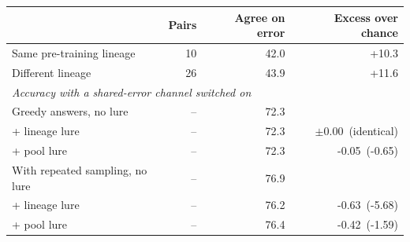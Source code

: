 \begin{tabular}{lrrr}
\toprule
& Pairs & Agree on error & Excess over chance \\
\midrule
Same pre-training lineage & 10 & 42.0 & +10.3 \\
Different lineage & 26 & 43.9 & +11.6 \\
\midrule
\multicolumn{4}{l}{\emph{Accuracy with a shared-error channel switched on}} \\
\quad Greedy answers, no lure & -- & 72.3 & \\
\quad\quad + lineage lure & -- & 72.3 & $\pm$0.00~(identical) \\
\quad\quad + pool lure & -- & 72.3 & -0.05~(-0.65) \\
\quad With repeated sampling, no lure & -- & 76.9 & \\
\quad\quad + lineage lure & -- & 76.2 & -0.63~(-5.68) \\
\quad\quad + pool lure & -- & 76.4 & -0.42~(-1.59) \\
\bottomrule
\end{tabular}
